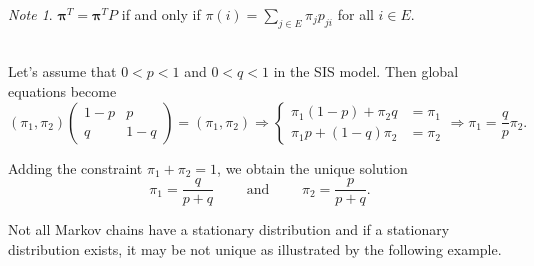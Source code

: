 \documentclass[11pt]{article}\usepackage[]{graphicx}\usepackage[]{color}
\numberwithin{algorithm}{section}
\theoremstyle{remark}
\newtheorem*{mynote}{Note}
\theoremstyle{definition}
\newenvironment{example}[1]{\begin{trivlist}
\item[\hskip \labelsep {\bfseries Example}: \underline{#1}]\ \\}{\end{trivlist}}
\begin{document}
\begin{mynote}
  $\boldsymbol{\pi}^T = \boldsymbol{\pi}^T P$ if and only if $\pi(i) = \sum_{j \in E} \pi_jp_{ji}$ for all $i \in E$.
\end{mynote}


\begin{example}{SIS model continued}
  Let's assume that $0 < p < 1$ and $0 < q < 1$ in the SIS model. Then global equations become
  \begin{equation*}
    (\pi_1, \pi_2) 
    \begin{pmatrix}
      1-p & p \\
      q &1-q
    \end{pmatrix}=
    (\pi_1,\pi_2) 
    \Rightarrow
  \begin{cases}
    \pi_1(1-p) + \pi_2 q &= \pi_1\\
    \pi_1 p + (1-q)\pi_2 &= \pi_2
  \end{cases}
  \Rightarrow \pi_1 = \frac{q}{p} \pi_2.
  \end{equation*} 
\end{example}
Adding the constraint $\pi_1 + \pi_2 = 1$, we obtain the unique solution 
\begin{equation*}
  \pi_1 = \frac{q}{p+q} \qquad \text{ and } \qquad \pi_2 = \frac{p}{p+q}.
\end{equation*}

Not all Markov chains have a stationary distribution and if a stationary distribution exists, it may be
not unique as illustrated by the following example.

\end{document}
